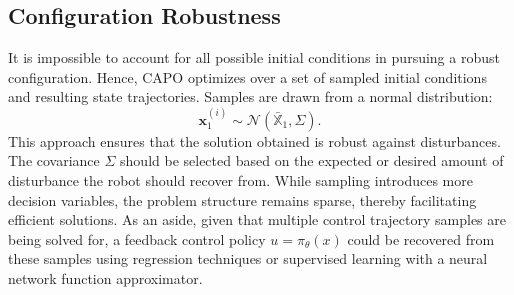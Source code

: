 \documentclass[runningheads]{llncs}
\newcommand{\todo}[1]{\textcolor{red}{TODO: #1}}
\begin{document}
\subsection{Configuration Robustness}\label{sec:method:ic}
It is impossible to account for all possible initial conditions in pursuing a robust configuration. Hence, CAPO optimizes over a set of sampled initial conditions and resulting state trajectories. Samples are drawn from a normal distribution:
\begin{equation}
\textbf{x}^{(i)}_1 \sim\mathcal{N}(\bar{\mathbb{X}}_1,\Sigma) .
\end{equation}
This approach ensures that the solution obtained is robust against disturbances. The covariance $\Sigma$ should be selected based on the expected or desired amount of disturbance the robot should recover from. While sampling introduces more decision variables, the problem structure remains sparse, thereby facilitating efficient solutions. As an aside, given that multiple control trajectory samples are being solved for, a feedback control policy $u = {\pi}_\theta(x)$ could be recovered from these samples using regression techniques or supervised learning with a neural network function approximator. 




\end{document}
